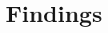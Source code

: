 \documentclass[10pt]{extarticle}
\begin{document}
    
    \clearpage

    \tableofcontents
    \clearpage

    

    
    \clearpage

    \section{Findings}
    
    \clearpage 

    
\end{document}

